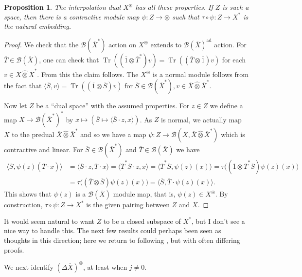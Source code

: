 \documentclass[a4paper,11pt]{article}
\theoremstyle{plain}
\newtheorem{proposition}{Proposition}[section]
\theoremstyle{remark}
\newcommand{\mc}[1]{\mathcal{#1}}
\newcommand{\ip}[2]{{\langle {#1} , {#2} \rangle}}
\newcommand{\proten}{\widehat\otimes}
\newcommand{\intdual}{\circledast}
\newcommand{\tr}{\operatorname{Tr}}
\newcommand{\ad}{{\operatorname{ad}}}
\begin{document}
\begin{proposition}
The interpolation dual $X^\intdual$ has all these properties.  If $Z$ is such a space, then there is a contractive module map $\psi \colon Z \to \intdual$ such that $\tau\circ\psi \colon Z \to X^*$ is the natural embedding.
\end{proposition}
\begin{proof}
We check that the $\mc B(\overline X^*)$ action on $X^\intdual$ extends to $\mc B(\overline X)^\ad$ action.  For $\overline T\in\mc B(\overline X)$, one can check that $\tr((\overline 1\otimes\overline T^*)v) = \tr((\overline T\otimes \overline 1)v)$ for each $v \in \overline X\proten\overline X^*$.  From this the claim follows.  The $X^\intdual$ is a normal module follows from the fact that $\ip{\overline S}{v} = \tr((\overline 1\otimes \overline S)v)$ for $\overline S\in\mc B(\overline X^*), v \in \overline X\proten\overline X^*$.

Now let $Z$ be a ``dual space'' with the assumed properties.  For $z\in Z$ we define a map $X\to \mc B(\overline X^*)^*$ by $x \mapsto (\overline S \mapsto \ip{\overline S\cdot z}{x})$.  As $Z$ is normal, we actually map $X$ to the predual $\overline X\proten\overline X^*$ and so we have a map $\psi \colon Z \to \mc B(X, \overline X\proten\overline X^*)$ which is contractive and linear.  For $\overline S\in\mc B(\overline X^*)$ and $\overline T\in\mc B(\overline X)$ we have
\begin{align*}
\ip{\overline S}{\psi(z)(\overline T\cdot x)}
&= \ip{\overline S \cdot z}{\overline T\cdot x}
= \ip{\overline T^*\overline S \cdot z}{x}
= \ip{\overline T^*\overline S}{\psi(z)(x)}
= \tau\big( (\overline 1\otimes\overline T^*\overline S) \psi(z)(x) \big) \\
&= \tau\big( (\overline T\otimes\overline S) \psi(z)(x) \big)
= \ip{\overline S}{\overline T \cdot \psi(z)(x)}.
\end{align*}
This shows that $\psi(z)$ is a $\mc B(\overline X)$ module map, that is, $\psi(z) \in X^\intdual$.  By construction, $\tau \circ \psi \colon Z \to X^*$ is the given pairing between $Z$ and $X$.
\end{proof}

It would seem natural to want $Z$ to be a closed subspace of $X^*$, but I don't see a nice way to handle this.  The next few results could perhaps been seen as thoughts in this direction; here we return to following \cite{KP_InterpolationFunctorsDuality}, but with often differing proofs.

We next identify $(\Delta\overline X)^\intdual$, at least when $j\not=0$.
\end{document}
